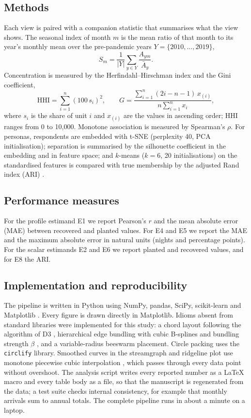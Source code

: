 \documentclass[11pt,a4paper]{article}
\begin{document}
\subsection{Methods}
Each view is paired with a companion statistic that summarises what the view shows. The seasonal index of
month $m$ is the mean ratio of that month to its year's monthly mean over the pre-pandemic years
$Y = \{2010, \dots, 2019\}$,
\begin{equation}
S_m = \frac{1}{|Y|} \sum_{y \in Y} \frac{A_{ym}}{\bar{A}_y}.
\end{equation}
Concentration is measured by the Herfindahl--Hirschman index and the Gini coefficient,
\begin{equation}
\mathrm{HHI} = \sum_{i=1}^{n} (100\, s_i)^2, \qquad
G = \frac{\sum_{i=1}^{n} (2i - n - 1)\, x_{(i)}}{n \sum_{i=1}^{n} x_i},
\end{equation}
where $s_i$ is the share of unit $i$ and $x_{(i)}$ are the values in ascending order; HHI ranges from 0 to
10{,}000. Monotone association is measured by Spearman's $\rho$. For personas, respondents are embedded with
t-SNE (perplexity 40, PCA initialisation); separation is summarised by the silhouette coefficient
\citep{rousseeuw1987} in the embedding and in feature space; and $k$-means ($k = 6$, 20 initialisations) on the
standardised features is compared with true membership by the adjusted Rand index (ARI) \citep{hubert1985}.

\subsection{Performance measures}
For the profile estimand E1 we report Pearson's $r$ and the mean absolute error (MAE) between recovered and
planted values. For E4 and E5 we report the MAE and the maximum absolute error in natural units (nights and
percentage points). For the scalar estimands E2 and E6 we report planted and recovered values, and for E8 the
ARI.

\subsection{Implementation and reproducibility}\label{sec:implementation}
The pipeline is written in Python using NumPy, pandas, SciPy, scikit-learn \citep{pedregosa2011} and
Matplotlib \citep{hunter2007}. Every figure is drawn directly in Matplotlib. Idioms absent from standard
libraries were implemented for this study: a chord layout following the algorithm of D3 \citep{bostock2011},
hierarchical edge bundling with cubic B-splines and bundling strength $\beta$ \citep{holten2006}, and a
variable-radius beeswarm placement. Circle packing uses the \texttt{circlify} library. Smoothed curves in the
streamgraph and ridgeline plot use monotone piecewise cubic interpolation \citep{fritsch1980}, which passes
through every data point without overshoot. The analysis script writes every reported number as a \LaTeX{}
macro and every table body as a file, so that the manuscript is regenerated from the data; a test suite
checks internal consistency, for example that monthly arrivals sum to annual totals. The complete pipeline
runs in about a minute on a laptop.
\end{document}
